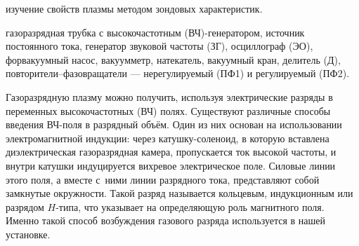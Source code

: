 




\begin{lab:aim}
{изучение свойств плазмы методом зондовых характеристик.}
\end{lab:aim}

\begin{lab:equipment}{газоразрядная трубка с высокочастотным (ВЧ)-генератором, источник постоянного тока, генератор звуковой частоты
(ЗГ), осциллограф (ЭО), форвакуумный насос, вакуумметр, натекатель, вакуумный кран, делитель (Д), повторители--фазовращатели --- нерегулируемый (ПФ1) и регулируемый (ПФ2).}
\end{lab:equipment}


Газоразрядную плазму можно получить, используя электрические разряды в переменных высокочастотных (ВЧ) полях. Существуют
различные способы введения ВЧ-поля в разрядный объём. Один из них основан на использовании электромагнитной индукции:
через катушку-соленоид, в которую вставлена диэлектрическая газоразрядная камера, пропускается ток высокой частоты, и
внутри катушки индуцируется вихревое электрическое поле. Силовые линии этого поля, а вместе с~ними линии разрядного
тока, представляют собой замкнутые окружности. Такой разряд называется кольцевым, индукционным или разрядом $H$-типа,
что указывает на определяющую роль магнитного поля. Именно такой способ возбуждения газового разряда используется в нашей
установке.

